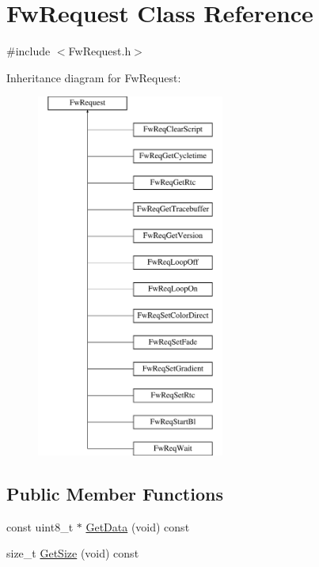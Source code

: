 \hypertarget{class_fw_request}{\section{Fw\-Request Class Reference}
\label{class_fw_request}
}


{\ttfamily \#include $<$Fw\-Request.\-h$>$}

Inheritance diagram for Fw\-Request\-:\begin{figure}[H]
\begin{center}
\leavevmode
\includegraphics[height=12.000000cm]{class_fw_request}
\end{center}
\end{figure}
\subsection*{Public Member Functions}
\begin{DoxyCompactItemize}
\item 
const uint8\-\_\-t $\ast$ \hyperlink{class_fw_request_aeb9c17657d7eb0b5575bc1f24dab50eb}{Get\-Data} (void) const 
\item 
size\-\_\-t \hyperlink{class_fw_request_a1f8757346609420c5e43d8e24c9f8f52}{Get\-Size} (void) const 
\end{DoxyCompactItemize}
